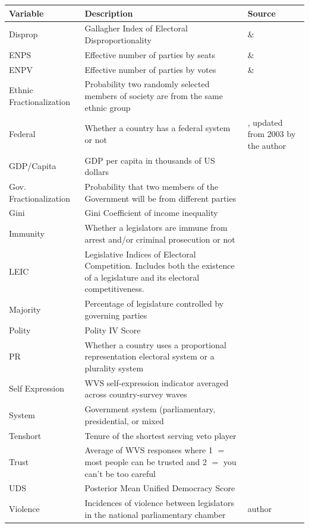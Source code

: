 \documentclass[a4paper]{article}\usepackage{graphicx, color}
\begin{document}
\begin{table}[!h]
\begin{center}
\begin{tabular}{l m{7cm} m{3.5cm}}
            \hline
            Variable & Description & Source \\
            \hline \hline
            Disprop & Gallagher Index of Electoral Disproportionality & \cite{Gallagher2012} \& \cite{Carey2011} \\
            ENPS & Effective number of parties by seats & \cite{Gallagher2012} \& \cite{Carey2011} \\
            ENPV & Effective number of parties by votes & \cite{Gallagher2012} \& \cite{Carey2011} \\
            Ethnic Fractionalization & Probability two randomly selected members of society are from the same ethnic group & \cite{Alesina2003} \\
            Federal & Whether a country has a federal system or not & \cite{Carey2011}, updated from 2003 by the author \\           
            GDP/Capita & GDP per capita in thousands of US dollars & \cite{WorldBank2011} \\
            Gov. Fractionalization & Probability that two members of the Government will be from different parties & \cite{DPI2001} \\
            Gini & Gini Coefficient of income inequality & \cite{UNU2008} \\
            Immunity & Whether a legislators are immune from arrest and/or criminal prosecution or not & \cite{Fish2009} \\
            LEIC & Legislative Indices of Electoral Competition. Includes both the existence of a legislature and its electoral competitiveness. & \cite{DPI2001} \\
            Majority & Percentage of legislature controlled by governing parties & \cite{DPI2001} \\
            Polity & Polity IV Score & \cite{Marshall2009} \\
            PR & Whether a country uses a proportional representation electoral system or a plurality system & \cite{DPI2001} \\
            Self Expression & WVS self-expression indicator averaged across country-survey waves & \cite{WVS2009} \\
            System & Government system (parliamentary, presidential, or mixed & \cite{DPI2001} \\
            Tenshort & Tenure of the shortest serving veto player & \cite{DPI2001} \\
            Trust & Average of WVS responses where 1 $=$ most people can be trusted and 2 $=$ you can't be too careful & \cite{WVS2009} \\
            UDS & Posterior Mean Unified Democracy Score & \cite{Pemstein2010} \\
            Violence & Incidences of violence between legislators in the national parliamentary chamber & author \\
            \hline


\end{tabular}
\end{center}
\end{table}
\end{document}

